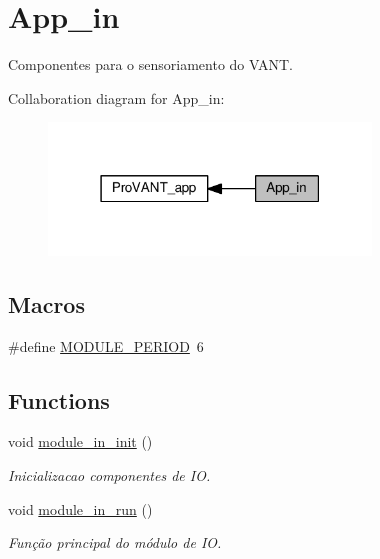 \hypertarget{group__app__in}{}\section{App\+\_\+in}
\label{group__app__in}


Componentes para o sensoriamento do V\+A\+NT.  


Collaboration diagram for App\+\_\+in\+:\nopagebreak
\begin{figure}[H]
\begin{center}
\leavevmode
\includegraphics[width=243pt]{group__app__in}
\end{center}
\end{figure}
\subsection*{Macros}
\begin{DoxyCompactItemize}
\item 
\#define \hyperlink{group__app__in_ga0ac6c9f2991b096e49c354e5cce6fae0}{M\+O\+D\+U\+L\+E\+\_\+\+P\+E\+R\+I\+OD}~6
\end{DoxyCompactItemize}
\subsection*{Functions}
\begin{DoxyCompactItemize}
\item 
void \hyperlink{group__app__in_gaffe0980a750cbec13ebf241c933460dd}{module\+\_\+in\+\_\+init} ()
\begin{DoxyCompactList}\small\item\em Inicializacao componentes de IO. \end{DoxyCompactList}\item 
void \hyperlink{group__app__in_ga2b56089e4c5adb9ac8b7a41fc1a0b0b2}{module\+\_\+in\+\_\+run} ()
\begin{DoxyCompactList}\small\item\em Função principal do módulo de IO. \end{DoxyCompactList}\end{DoxyCompactItemize}
